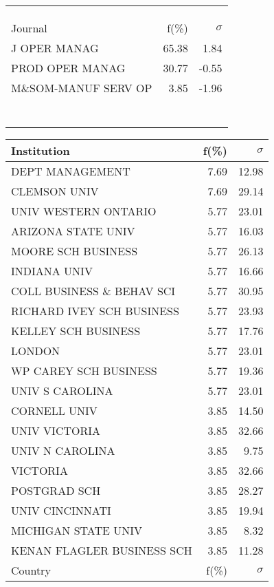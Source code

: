 \documentclass[a4paper,11pt]{report}
\begin{document}
\begin{landscape}
\begin{table}[!ht]
{\begin{tabular}{|l r  r|}
 &  & \\
 &  & \\
 &  & \\
\hline
\hline
Journal & f(\%) & $\sigma$\\
\hline
J OPER MANAG & 65.38 & 1.84\\
PROD OPER MANAG & 30.77 & -0.55\\
M\&SOM-MANUF SERV OP & 3.85 & -1.96\\
 &  & \\
 &  & \\
 &  & \\
 &  & \\
 &  & \\
 &  & \\
 &  & \\
\hline
\end{tabular}
}
{\scriptsize\begin{tabular}{|l r r|}
\hline
Institution & f(\%) & $\sigma$\\
\hline
DEPT MANAGEMENT & 7.69 & 12.98\\
CLEMSON UNIV & 7.69 & 29.14\\
UNIV WESTERN ONTARIO & 5.77 & 23.01\\
ARIZONA STATE UNIV & 5.77 & 16.03\\
MOORE SCH BUSINESS & 5.77 & 26.13\\
INDIANA UNIV & 5.77 & 16.66\\
COLL BUSINESS \& BEHAV SCI & 5.77 & 30.95\\
RICHARD IVEY SCH BUSINESS & 5.77 & 23.93\\
KELLEY SCH BUSINESS & 5.77 & 17.76\\
LONDON & 5.77 & 23.01\\
WP CAREY SCH BUSINESS & 5.77 & 19.36\\
UNIV S CAROLINA & 5.77 & 23.01\\
CORNELL UNIV & 3.85 & 14.50\\
UNIV VICTORIA & 3.85 & 32.66\\
UNIV N CAROLINA & 3.85 & 9.75\\
VICTORIA & 3.85 & 32.66\\
POSTGRAD SCH & 3.85 & 28.27\\
UNIV CINCINNATI & 3.85 & 19.94\\
MICHIGAN STATE UNIV & 3.85 & 8.32\\
KENAN FLAGLER BUSINESS SCH & 3.85 & 11.28\\
\hline
\hline
Country & f(\%) & $\sigma$\\
\hline

\end{tabular}}
\end{table}
\end{landscape}
\end{document}
